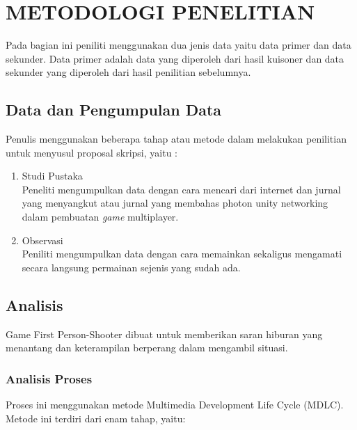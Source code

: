 \chapter{METODOLOGI PENELITIAN}
\noindent

Pada bagian ini peniliti menggunakan dua jenis data yaitu data primer dan data sekunder. Data primer adalah data yang diperoleh dari hasil kuisoner dan data sekunder yang diperoleh dari hasil penilitian sebelumnya.

\section{Data dan Pengumpulan Data}
\noindent

Penulis menggunakan beberapa tahap atau metode dalam melakukan penilitian untuk menyusul proposal skripsi, yaitu :

\begin{enumerate}
    \item Studi Pustaka \\ Peneliti mengumpulkan data dengan cara mencari dari internet dan jurnal yang menyangkut atau jurnal yang membahas photon unity networking dalam pembuatan \textit{game} multiplayer.
    \item Observasi \\ Peniliti mengumpulkan data dengan cara memainkan sekaligus mengamati secara langsung permainan sejenis yang sudah ada.
\end{enumerate}

\section{Analisis}
\noindent

Game First Person-Shooter dibuat untuk memberikan saran hiburan yang 
menantang dan keterampilan berperang dalam mengambil situasi.

\subsection{Analisis Proses}
\noindent

Proses ini menggunakan metode Multimedia Development Life Cycle 
(MDLC). Metode ini terdiri dari enam tahap, yaitu:

